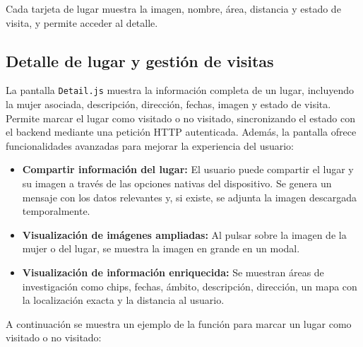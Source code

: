 Cada tarjeta de lugar muestra la imagen, nombre, área, distancia y estado de visita, y permite acceder al detalle.

\subsection{Detalle de lugar y gestión de visitas}

La pantalla \texttt{Detail.js} muestra la información completa de un lugar, incluyendo la mujer asociada, descripción, dirección, fechas, imagen y estado de visita. Permite marcar el lugar como visitado o no visitado, sincronizando el estado con el backend mediante una petición HTTP autenticada. Además, la pantalla ofrece funcionalidades avanzadas para mejorar la experiencia del usuario:

\begin{itemize}
    \item \textbf{Compartir información del lugar:} El usuario puede compartir el lugar y su imagen a través de las opciones nativas del dispositivo. Se genera un mensaje con los datos relevantes y, si existe, se adjunta la imagen descargada temporalmente.
    \item \textbf{Visualización de imágenes ampliadas:} Al pulsar sobre la imagen de la mujer o del lugar, se muestra la imagen en grande en un modal.
    \item \textbf{Visualización de información enriquecida:} Se muestran áreas de investigación como chips, fechas, ámbito, descripción, dirección, un mapa con la localización exacta y la distancia al usuario.
\end{itemize}

A continuación se muestra un ejemplo de la función para marcar un lugar como visitado o no visitado:

